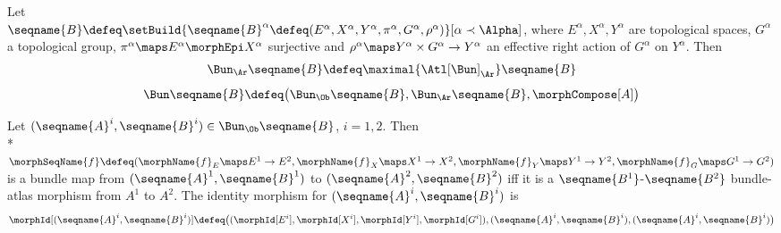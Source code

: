 \documentclass{article}
\begin{document}
\begin{definition}
\label{def:Bunmorph}
Let \\
$
  \seqname{B}
  \defeq
  \setBuild
    {{
      \seqname{B}^\alpha \defeq
      (
        E^\alpha,
        X^\alpha,
        Y^\alpha,
        \pi^\alpha,
        G^\alpha,
        \rho^\alpha
      )
    }}%
    [
      \alpha \prec \Alpha
    ]
$,
where $E^\alpha, X^\alpha, Y^\alpha$ are topological spaces,
$G^\alpha$ a topological group,
$\pi^\alpha \maps E^\alpha \morphEpi X^\alpha$ surjective and
$\rho^\alpha \maps Y^\alpha \times G^\alpha \to Y^\alpha$
an effective right action of $G^\alpha$ on $Y^\alpha$. Then
\begin{multline}
\Bun_\Ar \seqname{B} \defeq \maximal{\Atl[\Bun]_\Ar} \seqname{B}
\end{multline}
\begin{multline}
\Bun \seqname{B}
\defeq
  \bigl (
    \Bun_\Ob \seqname{B},
    \Bun_\Ar \seqname{B},
    \morphCompose[A]
  \bigr )
\end{multline}

Let $(\seqname{A}^i,\seqname{B}^i) \in \Bun_\Ob \seqname{B}$, $i=1,2$.
Then \\*
$
  \morphSeqName{f}
  \defeq
  (
    \morphName{f}_E \maps E^1 \to E^2,
    \morphName{f}_X \maps X^1 \to X^2,
    \morphName{f}_Y \maps Y^1 \to Y^2,
    \morphName{f}_G \maps G^1 \to G^2
  )
$
is a bundle map from $(\seqname{A}^1,\seqname{B}^1)$ to
$(\seqname{A}^2,\seqname{B}^2)$ iff it is a
$\seqname{B^1}$-$\seqname{B^2}$ bundle-atlas morphism from $A^1$ to
$A^2$. The identity morphism for $(\seqname{A}^i,\seqname{B}^i)$ is
\begin{equation}
\morphId[{{(\seqname{A}^i,\seqname{B}^i)}}] \defeq
\bigl (
  (\morphId[{E^i}], \morphId[{X^i}], \morphId[{Y^i}], \morphId[{G^i}]),
  (\seqname{A}^i,\seqname{B}^i),
  (\seqname{A}^i,\seqname{B}^i)
\bigr )
\end{equation}
\end{definition}
\end{document}
